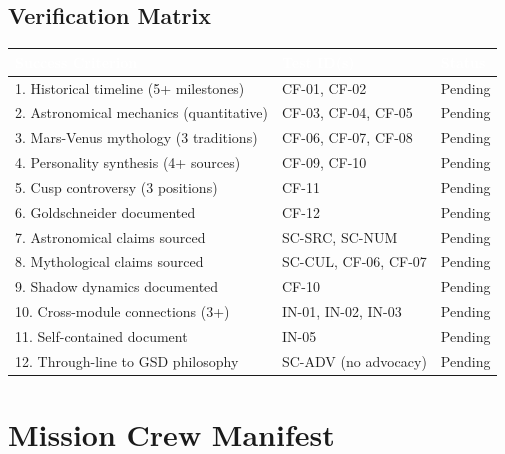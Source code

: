 \documentclass[11pt,letterpaper]{article}
\newcommand{\tableheader}[1]{\textbf{\sffamily\textcolor{white}{#1}}}
\begin{document}
\subsection{Verification Matrix}

\begin{center}
\begin{tabularx}{\textwidth}{XL{3cm}C{1.5cm}}
\toprule
{}
\tableheader{Success Criterion} & \tableheader{Test ID(s)} & \tableheader{Status} \\
. Historical timeline (5+ milestones) & CF-01, CF-02 & Pending \\
2. Astronomical mechanics (quantitative) & CF-03, CF-04, CF-05 & Pending \\
3. Mars-Venus mythology (3 traditions) & CF-06, CF-07, CF-08 & Pending \\
4. Personality synthesis (4+ sources) & CF-09, CF-10 & Pending \\
5. Cusp controversy (3 positions) & CF-11 & Pending \\
6. Goldschneider documented & CF-12 & Pending \\
7. Astronomical claims sourced & SC-SRC, SC-NUM & Pending \\
8. Mythological claims sourced & SC-CUL, CF-06, CF-07 & Pending \\
9. Shadow dynamics documented & CF-10 & Pending \\
10. Cross-module connections (3+) & IN-01, IN-02, IN-03 & Pending \\
11. Self-contained document & IN-05 & Pending \\
12. Through-line to GSD philosophy & SC-ADV (no advocacy) & Pending \\
\bottomrule
\end{tabularx}
\end{center}

\section{Mission Crew Manifest}
\end{document}
